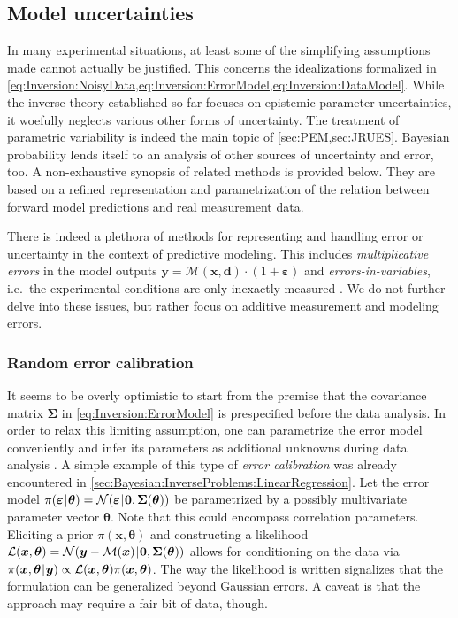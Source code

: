 \subsection{Model uncertainties} \label{sec:Bayesian:InverseProblems:ModelUncertainties}
In many experimental situations, at least some of the simplifying assumptions made cannot actually be justified.
This concerns the idealizations formalized in \cref{eq:Inversion:NoisyData,eq:Inversion:ErrorModel,eq:Inversion:DataModel}.
While the inverse theory established so far focuses on epistemic parameter uncertainties, it woefully neglects various other forms of uncertainty.
The treatment of parametric variability is indeed the main topic of \cref{sec:PEM,sec:JRUES}.
Bayesian probability lends itself to an analysis of other sources of uncertainty and error, too.
A non-exhaustive synopsis of related methods is provided below.
They are based on a refined representation and parametrization of the relation between forward model predictions and real measurement data.
\par %
There is indeed a plethora of methods for representing and handling error or uncertainty in the context of predictive modeling.
This includes \emph{multiplicative errors} in the model outputs \(\bm{y} = \mathcal{M}(\bm{x},\bm{d}) \cdot (1 + \bm{\varepsilon})\)
and \emph{errors-in-variables}, i.e.\ the experimental conditions are only inexactly measured \cite{Uncertainty:Fuller1987,Uncertainty:Carroll2006,Uncertainty:Buonaccorsi2010}.
We do not further delve into these issues, but rather focus on additive measurement and modeling errors.

\subsubsection{Random error calibration}
It seems to be overly optimistic to start from the premise that the covariance matrix \(\bm{\Sigma}\) in \cref{eq:Inversion:ErrorModel} is prespecified before the data analysis.
In order to relax this limiting assumption, one can parametrize the error model conveniently
and infer its parameters as additional unknowns during data analysis \cite{Bayesian:Zhang2010,Bayesian:Zhang2011,Bayesian:Zhang2012}.
A simple example of this type of \emph{error calibration} was already encountered in \cref{sec:Bayesian:InverseProblems:LinearRegression}.
Let the error model \(\pi(\bm{\varepsilon} {\:\!}|{\:\!} \bm{\theta}) = \mathcal{N}(\bm{\varepsilon} {\:\!}|{\:\!} \bm{0}, \bm{\Sigma}(\bm{\theta}))\)
be parametrized by a possibly multivariate parameter vector \(\bm{\theta}\).
Note that this could encompass correlation parameters.
Eliciting a prior \(\pi(\bm{x},\bm{\theta})\) and constructing a likelihood \(\mathcal{L}(\bm{x},\bm{\theta}) = \mathcal{N}(\bm{y} - \mathcal{M}(\bm{x}) {\:\!}|{\:\!} \bm{0}, \bm{\Sigma}(\bm{\theta}))\)
allows for conditioning on the data via \(\pi(\bm{x},\bm{\theta} {\:\!}|{\:\!} \bm{y}) \propto \mathcal{L}(\bm{x},\bm{\theta}) \pi(\bm{x},\bm{\theta})\).
The way the likelihood is written signalizes that the formulation can be generalized beyond Gaussian errors.
A caveat is that the approach may require a fair bit of data, though.

